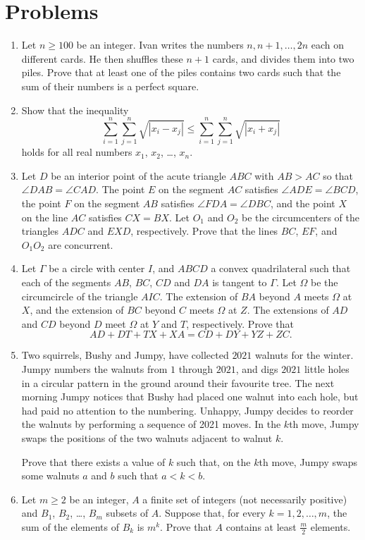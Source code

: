 \documentclass[11pt]{scrartcl}
\begin{document}
\section{Problems}
\begin{enumerate}[\bfseries 1.]
\item %
Let $n \ge 100$ be an integer.
Ivan writes the numbers $n, n+1, \dots, 2n$ each on different cards.
He then shuffles these $n+1$ cards, and divides them into two piles.
Prove that at least one of the piles contains two cards such that
the sum of their numbers is a perfect square.

\item %
Show that the inequality
\[\sum_{i=1}^n \sum_{j=1}^n \sqrt{|x_i-x_j|}
  \le \sum_{i=1}^n \sum_{j=1}^n \sqrt{|x_i+x_j|} \]
holds for all real numbers $x_1$, $x_2$, \dots, $x_n$.

\item %
Let $D$ be an interior point of the acute triangle $ABC$
with $AB > AC$ so that $\angle DAB = \angle CAD$.
The point $E$ on the segment $AC$ satisfies $\angle ADE =\angle BCD$,
the point $F$ on the segment $AB$ satisfies $\angle FDA =\angle DBC$,
and the point $X$ on the line $AC$ satisfies $CX = BX$.
Let $O_1$ and $O_2$ be the circumcenters of the triangles
$ADC$ and $EXD$, respectively.
Prove that the lines $BC$, $EF$, and $O_1O_2$ are concurrent.

\item %
Let $\Gamma$ be a circle with center $I$, and $ABCD$ a convex quadrilateral
such that each of the segments $AB$, $BC$, $CD$ and $DA$ is tangent to $\Gamma$.
Let $\Omega$ be the circumcircle of the triangle $AIC$.
The extension of $BA$ beyond $A$ meets $\Omega$ at $X$,
and the extension of $BC$ beyond $C$ meets $\Omega$ at $Z$.
The extensions of $AD$ and $CD$ beyond $D$ meet $\Omega$ at $Y$ and $T$, respectively.
Prove that
\[ AD + DT + TX + XA = CD + DY + YZ + ZC. \]

\item %
Two squirrels, Bushy and Jumpy, have collected $2021$ walnuts for the winter.
Jumpy numbers the walnuts from $1$ through $2021$, and digs $2021$ little holes
in a circular pattern in the ground around their favourite tree.
The next morning Jumpy notices that Bushy had placed one walnut into each hole,
but had paid no attention to the numbering.
Unhappy, Jumpy decides to reorder the walnuts by performing a sequence of 2021 moves.
In the $k$th move, Jumpy swaps the positions of the two walnuts adjacent to walnut $k$.

Prove that there exists a value of $k$ such that, on the $k$th move,
Jumpy swaps some walnuts $a$ and $b$ such that $a<k<b$.

\item %
Let $m \ge 2$ be an integer,
$A$ a finite set of integers (not necessarily positive)
and $B_1$, $B_2$, \dots, $B_m$ subsets of $A$.
Suppose that, for every $k=1,2,\dots,m$,
the sum of the elements of $B_k$ is $m^k$.
Prove that $A$ contains at least $\frac{m}{2}$ elements.

\end{enumerate}
\pagebreak
\end{document}
